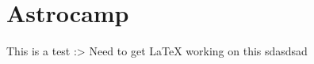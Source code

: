 \documentclass{article}
\title{}
\author{}
\date{}
\begin{document}
\maketitle
\tableofcontents
\pagebreak
\section{Astrocamp}
This is a test :>
Need to get LaTeX working on this
sdasdsad
\end{document}
